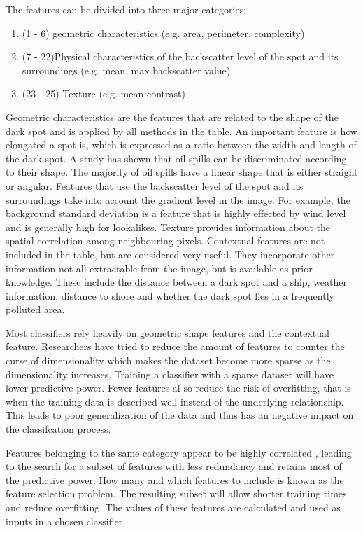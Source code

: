 The features can be divided into three major categories\cite{Brekke200595}:
\begin{enumerate}
\item (1 - 6) geometric characteristics (e.g. area, perimeter, complexity)
\item (7 - 22)Physical characteristics of the backscatter level of the spot and its surroundings (e.g. mean, max backscatter value)
\item (23 - 25) Texture (e.g. mean contrast)
\end{enumerate}

Geometric characteristics are the features that are related to the shape of the dark spot and is applied by all methods in the table\cite{Topouzelis200930}. An important feature is how elongated a spot is, which is expressed as a ratio between the width and length of the dark spot\cite{Gasull20071}. A study has shown that oil spills can be discriminated according to their shape\cite{Guo2014146}. The majority of oil spills have a linear shape that is either straight or angular\cite{Pavlakis200156}. Features that use the backscatter level of the spot and its surroundings take into account the gradient level in the image. For example, the background standard deviation is a feature that is highly effected by wind level and is generally high for lookalikes. Texture provides information about the spatial correlation among neighbouring pixels. Contextual features are not included in the table, but are considered very useful\cite{Topouzelis200930}. They incorporate other information not all extractable from the image, but is available as prior knowledge. These include the distance between a dark spot and a ship, weather information, distance to shore and whether the dark spot lies in a frequently polluted area.

Most classifiers rely heavily on geometric shape features and the contextual feature.\cite{Xu201414} Researchers have tried to reduce the amount of features to counter the curse of dimensionality which makes the dataset become more sparse as the dimensionality increases. Training a classifier with a sparse dataset will have lower predictive power. Fewer features al so reduce the risk of overfitting, that is when the training data is described well instead of the underlying relationship. This leads to poor generalization of the data and thus has an negative impact on the classifcation process.

Features belonging to the same category appear to be highly correlated \cite{Xu201414}, leading to the search for a subset of features with less redundancy and retains most of the predictive power. How many and which features to include is known as the feature selection problem. The resulting subset will allow shorter training times and reduce overfitting. The values of these features are calculated and used as inputs in a chosen classifier.
